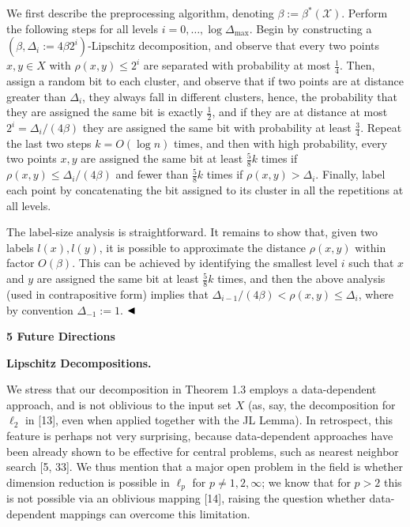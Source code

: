 We first describe the preprocessing algorithm, denoting $\beta:=\beta^{*}(\mathcal{X})$. Perform the following steps for all levels $i=0,\ldots,\log{\Delta_{\text{max}}}$. Begin by constructing a $(\beta,\Delta_{i}:=4\beta 2^{i})$-Lipschitz decomposition, and observe that every two points $x,y\in X$ with $\rho(x,y)\leq 2^{i}$ are separated with probability at most $\frac{1}{4}$. Then, assign a random bit to each cluster, and observe that if two points are at distance greater than $\Delta_{i}$, they always fall in different clusters, hence, the probability that they are assigned the same bit is exactly $\frac{1}{2}$, and if they are at distance at most $2^{i}=\Delta_{i}/(4\beta)$ they are assigned the same bit with probability at least $\frac{3}{4}$. Repeat the last two steps $k=O(\log{n})$ times, and then with high probability, every two points $x,y$ are assigned the same bit at least $\frac{5}{8}k$ times if $\rho(x,y)\leq\Delta_{i}/(4\beta)$ and fewer than $\frac{5}{8}k$ times if $\rho(x,y)>\Delta_{i}$. Finally, label each point by concatenating the bit assigned to its cluster in all the repetitions at all levels.
\par
\par
The label-size analysis is straightforward. It remains to show that, given two labels $l(x),l(y)$, it is possible to approximate the distance $\rho(x,y)$ within factor $O(\beta)$. This can be achieved by identifying the smallest level $i$ such that $x$ and $y$ are assigned the same bit at least $\frac{5}{8}k$ times, and then the above analysis (used in contrapositive form) implies that $\Delta_{i-1}/(4\beta)<\rho(x,y)\leq\Delta_{i}$, where by convention $\Delta_{-1}:=1$. $\hfill\blacktriangleleft$
\par
\par
\par
\par\medskip\noindent\textbf{5 Future Directions}\par
\par\medskip\noindent\textbf{Lipschitz Decompositions.}\par
We stress that our decomposition in Theorem 1.3 employs a data-dependent approach, and is not oblivious to the input set $X$ (as, say, the decomposition for $\ell_{2}$ in [13], even when applied together with the JL Lemma). In retrospect, this feature is perhaps not very surprising, because data-dependent approaches have been already shown to be effective for central problems, such as nearest neighbor search [5, 33]. We thus mention that a major open problem in the field is whether dimension reduction is possible in $\ell_{p}$ for $p\neq 1,2,\infty$; we know that for $p>2$ this is not possible via an oblivious mapping [14], raising the question whether data-dependent mappings can overcome this limitation.
